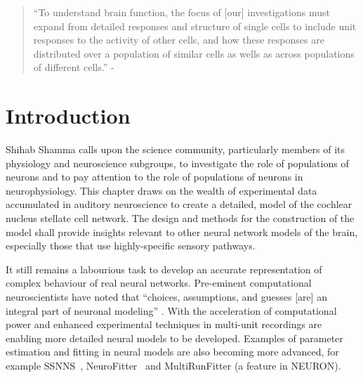 
\begin{quotation}
  ``To understand brain function, the focus of [our] investigations must expand from detailed responses and structure of single cells to include unit responses to the activity of other cells, and how these responses are distributed over a population of similar cells as wells as across populations  of different cells.''  
- \textit{\citet[p.]{Shamma:1998}}
\end{quotation}


\section{Introduction    \label{sec:CN:introduction}}

Shihab Shamma calls upon the science community, particularly members of its physiology and neuroscience subgroups, to investigate the role of populations of neurons and to pay attention to the role of populations of neurons in neurophysiology. 
This chapter draws on the wealth of experimental data accumulated in auditory neuroscience to create a detailed, \BNN model of the cochlear nucleus stellate cell network. 
The design and methods for the construction of the model shall provide insights relevant to other neural network models of the brain, especially those that use highly-specific sensory pathways.  

It still remains a labourious task to develop an accurate representation of complex behaviour of real neural networks. 
Pre-eminent computational neuroscientists have noted that ``choices, assumptions, and guesses [are] an integral part of neuronal modeling'' \citep{SegevBurkeEtAl:1998}. 
With the acceleration of computational power and enhanced experimental techniques in multi-unit recordings are enabling more detailed neural models to be developed. 
Examples of parameter estimation and fitting in neural models are
also becoming more advanced, for example SSNNS~\citep{SichtigSchafferEtAl:2008}, NeuroFitter \citep{VanAchardEtAl:2007}~and MultiRunFitter (a feature in NEURON).

